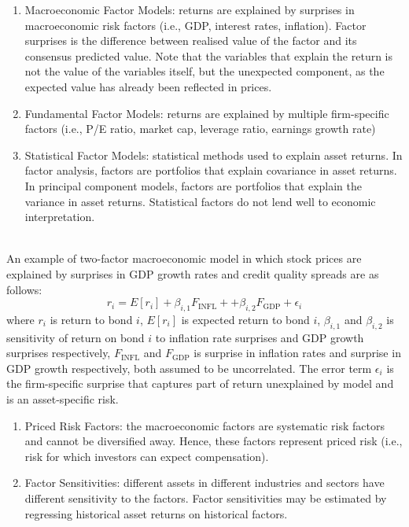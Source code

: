 \begin{remark} 
\begin{enumerate}[label=\roman*.]
\setlength{\itemsep}{0pt}
\item Macroeconomic Factor Models: returns are explained by surprises in macroeconomic risk factors (i.e., GDP, interest rates, inflation). Factor surprises is the difference between realised value of the factor and its consensus predicted value. Note that the variables that explain the return is not the value of the variables itself, but the unexpected component, as the expected value has already been reflected in prices.
\item Fundamental Factor Models: returns are explained by multiple firm-specific factors (i.e., P/E ratio, market cap, leverage ratio, earnings growth rate)
\item Statistical Factor Models: statistical methods used to explain asset returns. In factor analysis, factors are portfolios that explain covariance in asset returns. In principal component models, factors are portfolios that explain the variance in asset returns. Statistical factors do not lend well to economic interpretation. 
\end{enumerate}
\end{remark}

\begin{definition} \\
An example of two-factor macroeconomic model in which stock prices are explained by surprises in GDP growth rates and credit quality spreads are as follows:
\begin{equation}
r_i = E[r_i] + \beta_{i,1} F_{\text{INFL}} + + \beta_{i,2} F_{\text{GDP}} + \epsilon_i \nonumber
\end{equation}
where $r_i$ is return to bond $i$, $E[r_i]$ is expected return to bond $i$, $\beta_{i,1}$ and $\beta_{i,2}$ is sensitivity of return on bond $i$ to inflation rate surprises and GDP growth surprises respectively, $F_{\text{INFL}}$ and $F_{\text{GDP}}$ is surprise in inflation rates and surprise in GDP growth respectively, both assumed to be uncorrelated. The error term $\epsilon_i$ is the firm-specific surprise that captures part of return unexplained by model and is an asset-specific risk.
\begin{enumerate}[label=\roman*.]
\setlength{\itemsep}{0pt}
\item Priced Risk Factors: the macroeconomic factors are systematic risk factors and cannot be diversified away. Hence, these factors represent priced risk (i.e., risk for which investors can expect compensation).
\item Factor Sensitivities: different assets in different industries and sectors have different sensitivity to the factors. Factor sensitivities may be estimated by regressing historical asset returns on historical factors.
\end{enumerate}
\end{definition}


